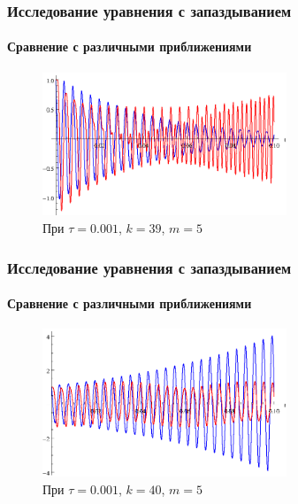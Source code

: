 \documentclass{beamer}
\numberwithin{equation}{section}
\begin{document}
    \begin{frame}
        \frametitle{Исследование уравнения с запаздыванием}
        \framesubtitle{Сравнение с различными приближениями}

        \begin{figure}[h]
        \begin{center}
            \includegraphics[width=0.65\textwidth]{example_large_good.eps}
        \end{center}
        \caption{При $\tau=0.001$, $k=39$, $m=5$}
        \end{figure}
    \end{frame}

    \begin{frame}
        \frametitle{Исследование уравнения с запаздыванием}
        \framesubtitle{Сравнение с различными приближениями}

        \begin{figure}[h]
        \begin{center}
            \includegraphics[width=0.65\textwidth]{example_large_bad.eps}
        \end{center}
        \caption{При $\tau=0.001$, $k=40$, $m=5$}
        \end{figure}
    \end{frame}
\end{document}
